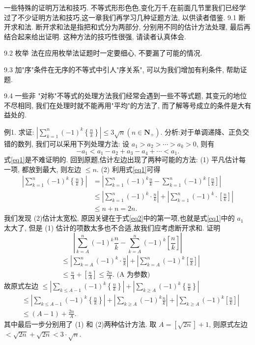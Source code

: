 
一些特殊的证明万法和技巧.
不等式形形色色,变化万千,在前面几节里我们已经学过了不少证明方法和技巧,这一章我们再学习几种证题方法, 以供读者借鉴.
9.1 断开求和法.
断开求和法是指把和式分为两部分, 分别用不同的估计方法处理, 最后再结合起来给出证明.
这种方法的技巧性很强, 请读者认真体会.



9.2 枚举 法在应用枚举法证题时一定要细心, 不要漏了可能的情况.



9.3 加"序"条件在无序的不等式中引人"序关系", 可以为我们增加有利条件, 帮助证题.



9.4 一些非 "对称"不等式的处理方法我们经常会遇到一些不等式题, 其变元的地位不尽相同, 我们在处理时就不能再用"平均"的方法了, 而了解等号成立的条件是大有益处的.



例1. 求证: $\left|\sum_{k=1}^n(-1)^k\left\{\frac{n}{k}\right\}\right| \leqslant 3 \sqrt{n}\left(n \in \mathbf{N}_{+}\right)$.
分析:对于单调递降、正负交错的数列, 我们可以采用下列处理方法:
设 $a_1>a_2>\cdots>a_k>0$, 则有
$$
-a_1<a_1-a_2+a_3-a_4+\cdots<a_1 . \label{eq1}
$$
式\ref{eq1}是不难证明的.
回到原题,估计左边出现了两种可能的方法:
(1) 平凡估计每一项, 都放到最大, 则左边 $\leqslant n$.
(2) 利用式\ref{eq1}可得
$$
\begin{aligned}
\left|\sum_{k=1}^n(-1)^k\left\{\frac{n}{k}\right\}\right| & =\left|\sum_{k=1}^n(-1)^k \frac{n}{k}-\sum_{k=1}^n(-1)^k\left[\frac{n}{k}\right]\right| \\
& \leqslant\left|\sum_{k=1}^n(-1)^k \cdot \frac{n}{k}\right|+\left|\sum_{k=1}^n(-1)^k \cdot\left[\frac{n}{k}\right]\right| \\
& \leqslant n+n=2 n .
\end{aligned} \label{eq2}
$$
我们发现 (2)估计太宽松, 原因关键在于式\ref{eq2}中的第一项,也就是式\ref{eq1}中的 $a_1$ 太大了, 但是 (1) 估计的项数太多也不合适,故我们应考虑断开求和.
证明
$$
\left|\sum_{k=A}^n(-1)^k \frac{n}{k}-\sum_{k=A}^n(-1)^k\left[\frac{n}{k}\right]\right|
$$
$$
\begin{aligned}
& \leqslant\left|\sum_{k=A}^n(-1)^k \cdot \frac{n}{k}\right|+\left|\sum_{k=A}^n(-1)^k\left[\frac{n}{k}\right]\right| \\
& \leqslant \frac{n}{A}+\left[\frac{n}{A}\right] \leqslant \frac{2 n}{A} \text {. (A 为参数) }
\end{aligned}
$$
故原式左边 $\leqslant\left|\sum_{k \leqslant A-1}(-1)^k\left\{\frac{n}{k}\right\}\right|+\left|\sum_{k \geqslant A}(-1)^k\left\{\frac{n}{k}\right\}\right|$
$$
\begin{aligned}
& \leqslant\left|\sum_{k \leqslant A-1}(-1)^k\left\{\frac{n}{k}\right\}\right|+\left|\sum_{k \geqslant A}(-1)^k \frac{n}{k}\right|+\left|\sum_{k \geqslant A}(-1)^k\left[\frac{n}{k}\right]\right| \\
& \leqslant(A-1)+\frac{2 n}{A} .
\end{aligned}
$$
其中最后一步分别用了 (1) 和 (2)两种估计方法.
取 $A=[\sqrt{2 n}]+1$, 则原式左边 $<\sqrt{2 n}+\sqrt{2 n}<3 \cdot \sqrt{n}$.



